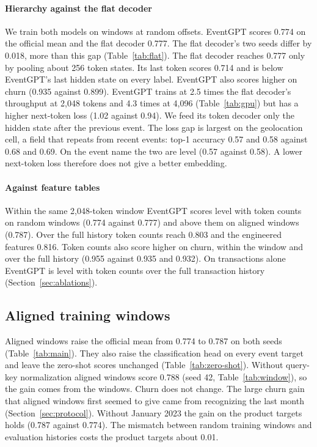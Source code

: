 \documentclass[12pt]{article}
\begin{document}
\paragraph{Hierarchy against the flat decoder} We train both models on windows at random offsets. EventGPT scores 0.774 on the official mean and the flat decoder 0.777. The flat decoder's two seeds differ by 0.018, more than this gap (Table~\ref{tab:flat}). The flat decoder reaches 0.777 only by pooling about 256 token states. Its last token scores 0.714 and is below EventGPT's last hidden state on every label. EventGPT also scores higher on churn (0.935 against 0.899). EventGPT trains at 2.5 times the flat decoder's throughput at 2,048 tokens and 4.3 times at 4,096 (Table~\ref{tab:gpu}) but has a higher next-token loss (1.02 against 0.94). We feed its token decoder only the hidden state after the previous event. The loss gap is largest on the geolocation cell, a field that repeats from recent events: top-1 accuracy 0.57 and 0.58 against 0.68 and 0.69. On the event name the two are level (0.57 against 0.58). A lower next-token loss therefore does not give a better embedding.

\paragraph{Against feature tables} Within the same 2,048-token window EventGPT scores level with token counts on random windows (0.774 against 0.777) and above them on aligned windows (0.787). Over the full history token counts reach 0.803 and the engineered features 0.816. Token counts also score higher on churn, within the window and over the full history (0.955 against 0.935 and 0.932). On transactions alone EventGPT is level with token counts over the full transaction history (Section~\ref{sec:ablations}).


\subsection{Aligned training windows}\label{sec:aligned}

Aligned windows raise the official mean from 0.774 to 0.787 on both seeds (Table~\ref{tab:main}). They also raise the classification head on every event target and leave the zero-shot scores unchanged (Table~\ref{tab:zero-shot}). Without query-key normalization aligned windows score 0.788 (seed 42, Table~\ref{tab:window}), so the gain comes from the windows. Churn does not change. The large churn gain that aligned windows first seemed to give came from recognizing the last month (Section~\ref{sec:protocol}). Without January 2023 the gain on the product targets holds (0.787 against 0.774). The mismatch between random training windows and evaluation histories costs the product targets about 0.01.
\end{document}
